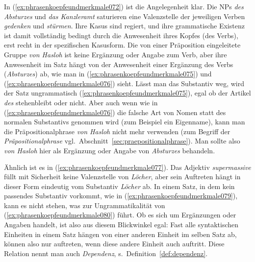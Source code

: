 
In (\ref{ex:phrasenkoepfeundmerkmale072}) ist die Angelegenheit klar.
Die NPs \textit{des Absturzes} und \textit{das Kanzleramt} saturieren eine Valenzstelle der jeweiligen Verben \textit{gedenken} und \textit{stürmen}.
Ihre Kasus sind regiert, und ihre grammatische Existenz ist damit vollständig bedingt durch die Anwesenheit ihres Kopfes (des Verbs), erst recht in der spezifischen Kasusform.
Die von einer Präposition eingeleitete Gruppe \textit{von Hasloh} ist keine Ergänzung oder Angabe zum Verb, aber ihre Anwesenheit im Satz hängt von der Anwesenheit einer Ergänzung des Verbs (\textit{Absturzes}) ab, wie man in (\ref{ex:phrasenkoepfeundmerkmale075}) und (\ref{ex:phrasenkoepfeundmerkmale076}) sieht.
Lässt man das Substantiv weg, wird der Satz ungrammatisch (\ref{ex:phrasenkoepfeundmerkmale075}), egal ob der Artikel \textit{des} stehenbleibt oder nicht.
Aber auch wenn wie in (\ref{ex:phrasenkoepfeundmerkmale076}) die falsche Art von Nomen statt des normalen Substantivs genommen wird (zum Beispiel ein Eigenname), kann man die Präpositionalphrase \textit{von Hasloh} nicht mehr verwenden (zum Begriff der \textit{Präpositionalphrase} vgl.\ Abschnitt~\ref{sec:praepositionalphrase}).
Man sollte also \textit{von Hasloh} hier als Ergänzung oder Angabe von \textit{Absturzes} behandeln.

Ähnlich ist es in (\ref{ex:phrasenkoepfeundmerkmale077}).
Das Adjektiv \textit{supermassive} füllt mit Sicherheit keine Valenzstelle von \textit{Löcher}, aber sein Auftreten hängt in dieser Form eindeutig vom Substantiv \textit{Löcher} ab.
In einem Satz, in dem kein passendes Substantiv vorkommt, wie in (\ref{ex:phrasenkoepfeundmerkmale079}), kann es nicht stehen, was zur Ungrammatikalität von (\ref{ex:phrasenkoepfeundmerkmale080}) führt.
Ob es sich um Ergänzungen oder Angaben handelt, ist also aus diesem Blickwinkel egal:
Fast alle syntaktischen Einheiten in einem Satz hängen von einer anderen Einheit im selben Satz ab, können also nur auftreten, wenn diese andere Einheit auch auftritt.
Diese Relation nennt man auch \textit{Dependenz}, s.\ Definition~\ref{def:dependenz}.


